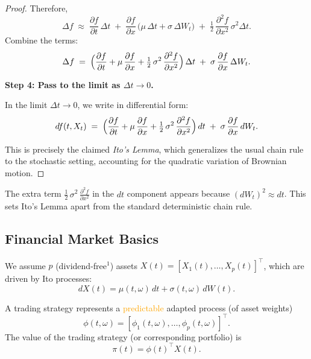 \begin{proof}
Therefore,
\[
   \Delta f 
   \;\approx\;
   \frac{\partial f}{\partial t}\,\Delta t
   \;+\;
   \frac{\partial f}{\partial x}\,\bigl(\mu\,\Delta t + \sigma\,\Delta W_t\bigr)
   \;+\;
   \tfrac{1}{2}\,\frac{\partial^2 f}{\partial x^2}\,\sigma^2 \Delta t.
\]
Combine the terms:
\[
   \Delta f
   \;=\;
   \Bigl(\frac{\partial f}{\partial t} 
         + \mu\,\frac{\partial f}{\partial x} 
         + \tfrac{1}{2}\,\sigma^2\,\frac{\partial^2 f}{\partial x^2}\Bigr)\,\Delta t
   \;+\;
   \sigma\,\frac{\partial f}{\partial x}\,\Delta W_t.
\]

\medskip
\textbf{Step 4: Pass to the limit as $\Delta t \to 0$.}

In the limit $\Delta t \to 0$, we write in differential form:
\[
   df(t,X_t)
   \;=\;
   \Bigl(\frac{\partial f}{\partial t} 
         + \mu\,\frac{\partial f}{\partial x} 
         + \tfrac{1}{2}\,\sigma^2\,\frac{\partial^2 f}{\partial x^2}\Bigr)\,dt
   \;+\;
   \sigma\,\frac{\partial f}{\partial x}\,dW_t.
\]

This is precisely the claimed \emph{Ito's Lemma}, which generalizes the usual chain rule to the stochastic setting, accounting for the quadratic variation of Brownian motion.
\end{proof}

\begin{remark}
The extra term $\tfrac{1}{2}\,\sigma^2\,\frac{\partial^2 f}{\partial x^2}$ in the $dt$ component
appears because $(dW_t)^2 \approx dt$. This sets Ito's Lemma apart from the standard
deterministic chain rule.
\end{remark}


\subsection{Financial Market Basics}
\begin{definition}
We assume \( p \) (dividend-free\(^1\)) assets \( X(t) = [X_1(t), \dots, X_p(t)]^\top \), which are driven by Ito processes:
\[
dX(t) = \mu(t, \omega)\,dt + \sigma(t, \omega)\,dW(t).
\]
\end{definition}

\begin{definition}
A trading strategy represents a \textcolor{orange}{predictable} adapted process (of asset weights)
\[
\phi(t, \omega) = [\phi_1(t, \omega), \dots, \phi_p(t, \omega)]^\top.
\]
The value of the trading strategy (or corresponding portfolio) is
\[
\pi(t) = \phi(t)^\top X(t).
\]
\end{definition}


